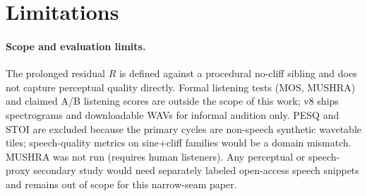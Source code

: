 \section{Limitations}
\label{sec:limitations}

\paragraph{Scope and evaluation limits.}
The prolonged residual $R$ is defined against a procedural no-cliff sibling and does not capture perceptual quality directly.
Formal listening tests (MOS, MUSHRA) and claimed A/B listening scores are outside the scope of this work; v8 ships spectrograms and downloadable WAVs for informal audition only.
PESQ and STOI are excluded because the primary cycles are non-speech synthetic wavetable tiles; speech-quality metrics on sine{+}cliff families would be a domain mismatch.
MUSHRA was not run (requires human listeners).
Any perceptual or speech-proxy secondary study would need separately labeled open-access speech snippets and remains out of scope for this narrow-seam paper.

